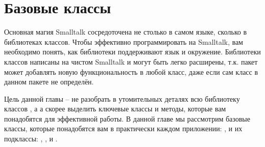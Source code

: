 \documentclass[a4paper,10pt,twoside]{book}
\begin{document}
	\renewcommand{\nnbb}[2]{} %
	\sloppy
\fi
\chapter{Базовые классы}

Основная магия Smalltalk сосредоточена не столько в самом языке, сколько в библиотеках классов. Чтобы эффективно программировать на Smalltalk, вам необходимо понять, как библиотеки поддерживают язык и окружение. Библиотеки классов написаны на чистом Smalltalk и могут быть легко расширены, т.к. пакет может добавлять новую функциональность в любой класс, даже если сам класс в данном пакете не определён.

Цель данной главы -- не разобрать в утомительных деталях всю библиотеку классов \pharo, а а скорее выделить ключевые классы и методы, которые вам понадобятся для эффективной работы. В данной главе мы рассмотрим базовые классы, которые понадобятся вам в практически каждом приложении: ,  и их подклассы: , ,  и .

\end{document}
